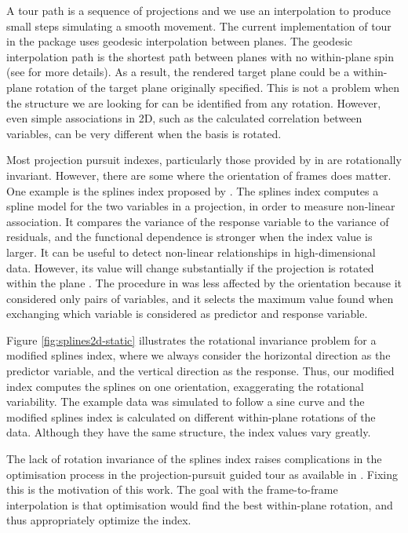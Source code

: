 A tour path is a sequence of projections and we use an interpolation to
produce small steps simulating a smooth movement. The current
implementation of tour in the  package uses geodesic
interpolation between planes. The geodesic interpolation path is the
shortest path between planes with no within-plane spin (see
\citet{Buja2004TheoryOD} for more details). As a result, the rendered
target plane could be a within-plane rotation of the target plane
originally specified. This is not a problem when the structure we are
looking for can be identified from any rotation. However, even simple
associations in 2D, such as the calculated correlation between
variables, can be very different when the basis is rotated.

Most projection pursuit indexes, particularly those provided by in
 are rotationally invariant. However, there are some
where the orientation of frames does matter. One example is the splines
index proposed by \citet{Grimm2016}. The splines index computes a spline
model for the two variables in a projection, in order to measure
non-linear association. It compares the variance of the response
variable to the variance of residuals, and the functional dependence is
stronger when the index value is larger. It can be useful to detect
non-linear relationships in high-dimensional data. However, its value
will change substantially if the projection is rotated within the plane
\citep{pp}. The procedure in \citet{Grimm2016} was less affected by the
orientation because it considered only pairs of variables, and it
selects the maximum value found when exchanging which variable is
considered as predictor and response variable.

Figure \ref{fig:splines2d-static} illustrates the rotational invariance
problem for a modified splines index, where we always consider the
horizontal direction as the predictor variable, and the vertical
direction as the response. Thus, our modified index computes the splines
on one orientation, exaggerating the rotational variability. The example
data was simulated to follow a sine curve and the modified splines index
is calculated on different within-plane rotations of the data. Although
they have the same structure, the index values vary greatly.

The lack of rotation invariance of the splines index raises
complications in the optimisation process in the projection-pursuit
guided tour as available in . Fixing this is the
motivation of this work. The goal with the frame-to-frame interpolation
is that optimisation would find the best within-plane rotation, and thus
appropriately optimize the index.

